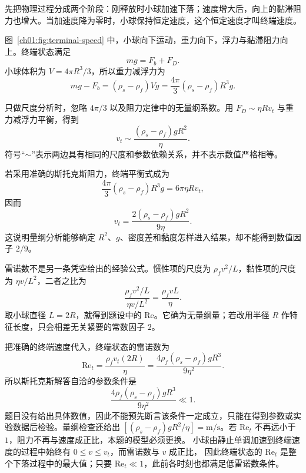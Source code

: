 \begin{xesolution}
先把物理过程分成两个阶段：刚释放时小球加速下落；速度增大后，向上的黏滞阻力也增大。当加速度降为零时，小球保持恒定速度，这个恒定速度才叫终端速度。

图~\ref{ch01:fig:terminal-speed} 中，小球向下运动，重力向下，浮力与黏滞阻力向上。终端状态满足
\begin{equation}
 mg=F_b+F_D.
\end{equation}
小球体积为 $V=4\pi R^3/3$，所以重力减浮力为
\[
 mg-F_b=(\rho_s-\rho_f)Vg
 =\frac{4\pi}{3}(\rho_s-\rho_f)R^3g.
\]

只做尺度分析时，忽略 $4\pi/3$ 以及阻力定律中的无量纲系数。用
$F_D\sim\eta Rv_t$ 与重力减浮力平衡，得到
\begin{equation}
 \boxed{v_t\sim\frac{(\rho_s-\rho_f)gR^2}{\eta}}.
\end{equation}
符号“$\sim$”表示两边具有相同的尺度和参数依赖关系，并不表示数值严格相等。

若采用准确的斯托克斯阻力，终端平衡式成为
\[
 \frac{4\pi}{3}(\rho_s-\rho_f)R^3g=6\pi\eta Rv_t,
\]
因而
\begin{equation}
 \boxed{v_t=\frac{2(\rho_s-\rho_f)gR^2}{9\eta}}.
\end{equation}
这说明量纲分析能够确定 $R^2$、$g$、密度差和黏度怎样进入结果，却不能得到数值因子 $2/9$。

雷诺数不是另一条凭空给出的经验公式。惯性项的尺度为
$\rho_fv^2/L$，黏性项的尺度为 $\eta v/L^2$，二者之比为
\[
 \frac{\rho_fv^2/L}{\eta v/L^2}=\frac{\rho_fvL}{\eta}.
\]
取小球直径 $L=2R$，就得到题设中的 $\mathrm{Re}$。它确为无量纲量；若改用半径 $R$ 作特征长度，只会相差无关紧要的常数因子 $2$。

把准确的终端速度代入，终端状态的雷诺数为
\begin{equation}
 \mathrm{Re}_t=\frac{\rho_f v_t(2R)}{\eta}
 =\frac{4\rho_f(\rho_s-\rho_f)gR^3}{9\eta^2}.
\end{equation}
所以斯托克斯解答自洽的参数条件是
\begin{equation}
 \boxed{\frac{4\rho_f(\rho_s-\rho_f)gR^3}{9\eta^2}\ll1}.
\end{equation}
题目没有给出具体数值，因此不能预先断言该条件一定成立，只能在得到参数或实验数据后检验。量纲检查还给出
$[(\rho_s-\rho_f)gR^2/\eta]=\mathrm{m/s}$。若 $\mathrm{Re}_t$ 不再远小于 $1$，阻力不再与速度成正比，本题的模型必须更换。
小球由静止单调加速到终端速度的过程中始终有 $0\le v\le v_t$，而雷诺数与 $v$ 成正比，
因此终端状态的 $\mathrm{Re}_t$ 是整个下落过程中的最大值；只要 $\mathrm{Re}_t\ll1$，此前各时刻也都满足低雷诺数条件。


\end{xesolution}
